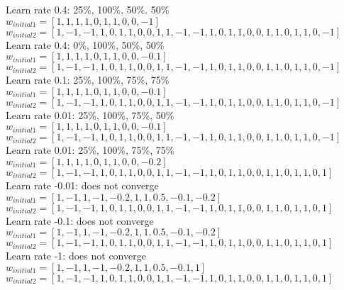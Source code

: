 \documentclass{article}
\begin{document}
Learn rate 0.4: 25\%, 100\%, 50\%. 50\%\\
$w_{initial1} = [1,1,1,1,0,1,1,0,0,-1]$\\
$w_{initial2} = [1,-1,-1,1,0,1,1,0,0,1,1,-1,-1,1,0,1,1,0,0,1,1,0,1,1,0,-1]$\\

Learn rate 0.4: 0\%, 100\%, 50\%, 50\%\\
$w_{initial1} = [1,1,1,1,0,1,1,0,0,-0.1]$\\
$w_{initial2} = [1,-1,-1,1,0,1,1,0,0,1,1,-1,-1,1,0,1,1,0,0,1,1,0,1,1,0,-1]$\\

Learn rate 0.1: 25\%, 100\%, 75\%, 75\%\\
$w_{initial1} = [1,1,1,1,0,1,1,0,0,-0.1]$\\
$w_{initial2} = [1,-1,-1,1,0,1,1,0,0,1,1,-1,-1,1,0,1,1,0,0,1,1,0,1,1,0,-1]$\\

Learn rate 0.01: 25\%, 100\%, 75\%, 50\%\\
$w_{initial1} = [1,1,1,1,0,1,1,0,0,-0.1]$\\
$w_{initial2} = [1,-1,-1,1,0,1,1,0,0,1,1,-1,-1,1,0,1,1,0,0,1,1,0,1,1,0,-1]$\\

Learn rate 0.01: 25\%, 100\%, 75\%, 75\%\\
$w_{initial1} = [1,1,1,1,0,1,1,0,0,-0.2]$\\
$w_{initial2} = [1,-1,-1,1,0,1,1,0,0,1,1,-1,-1,1,0,1,1,0,0,1,1,0,1,1,0,1]$\\

Learn rate -0.01: does not converge\\
$w_{initial1} = [1,-1,1,-1,-0.2,1,1,0.5,-0.1,-0.2]$\\
$w_{initial2} = [1,-1,-1,1,0,1,1,0,0,1,1,-1,-1,1,0,1,1,0,0,1,1,0,1,1,0,1]$\\

Learn rate -0.1: does not converge\\
$w_{initial1} = [1,-1,1,-1,-0.2,1,1,0.5,-0.1,-0.2]$\\
$w_{initial2} = [1,-1,-1,1,0,1,1,0,0,1,1,-1,-1,1,0,1,1,0,0,1,1,0,1,1,0,1]$\\

Learn rate -1: does not converge\\
$w_{initial1} = [1,-1,1,-1,-0.2,1,1,0.5,-0.1,1]$\\
$w_{initial2} = [1,-1,-1,1,0,1,1,0,0,1,1,-1,-1,1,0,1,1,0,0,1,1,0,1,1,0,1]$\\
\end{document}
